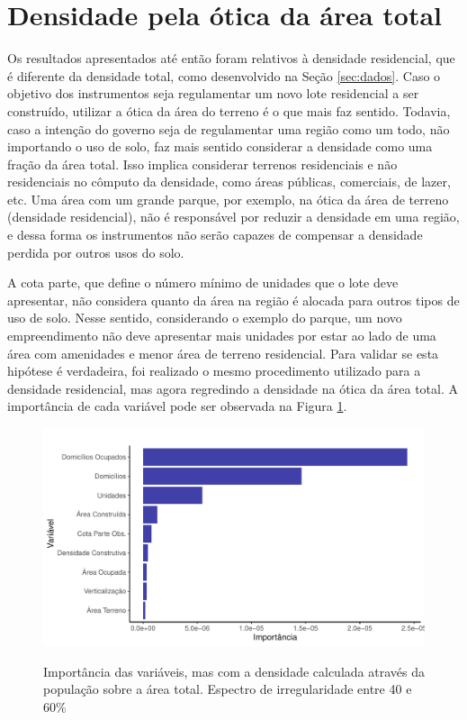 \section{Densidade pela ótica da área total}

Os resultados apresentados até então foram relativos à densidade residencial, que é diferente da densidade total, como desenvolvido na Seção \ref{sec:dados}. Caso o objetivo dos instrumentos seja regulamentar um novo lote residencial a ser construído, utilizar a ótica da área do terreno é o que mais faz sentido. Todavia, caso a intenção do governo seja de regulamentar uma região como um todo, não importando o uso de solo, faz mais sentido considerar a densidade como uma fração da área total. Isso implica considerar terrenos residenciais e não residenciais no cômputo da densidade, como áreas públicas, comerciais, de lazer, etc. Uma área com um grande parque, por exemplo, na ótica da área de terreno (densidade residencial), não é responsável por reduzir a densidade em uma região, e dessa forma os instrumentos não serão capazes de compensar a densidade perdida por outros usos do solo. 

A cota parte, que define o número mínimo de unidades que o lote deve apresentar, não considera quanto da área na região é alocada para outros tipos de uso de solo. Nesse sentido, considerando o exemplo do parque, um novo empreendimento não deve apresentar mais unidades por estar ao lado de uma área com amenidades e menor área de terreno residencial. Para validar se esta hipótese é verdadeira, foi realizado o mesmo procedimento utilizado para a densidade residencial, mas agora regredindo a densidade na ótica da área total. A importância de cada variável pode ser observada na Figura \ref{fig:importancia_densmod}.

\begin{figure}[h]
    \centering
    \caption{Importância das variáveis, mas com a densidade calculada através da população sobre a área total. Espectro de irregularidade entre 40 e 60\%}
    \includegraphics[width = .95\linewidth]{imagens/var_importance_densmod.pdf}
    \label{fig:importancia_densmod}
\end{figure}

